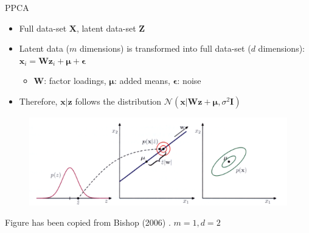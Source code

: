 \documentclass{beamer}
\begin{document}
\begin{frame}{PPCA}
\begin{itemize}
    \item Full data-set $\bm{X}$, latent data-set $\bm{Z}$
    \item Latent data ($m$ dimensions) is transformed into full data-set ($d$ dimensions): $\bm{x}_i = \bm{W}\bm{z}_i+\bm{\mu}+\bm{\epsilon}$
    \begin{itemize}
        \item $\bm{W}$: factor loadings, $\bm{\mu}$: added means, $\bm{\epsilon}$: noise
    \end{itemize}
    \item Therefore, $\bm{x}|\bm{z}$ follows the distribution $\mathcal{N}(\bm{x}|\bm{Wz}+\bm{\mu}, \sigma^2\bm{I})$
\end{itemize}

\begin{figure}
    \centering
    \includegraphics[width=.8\textwidth]{Screenshot_2020-07-14 Pattern Recognition and Machine Learning - Bishop_PatternRecognitionAndMachineLearning pdf.png}
\end{figure}
\footnotesize
Figure has been copied from Bishop (2006) \cite{bishop2006pattern}. $m=1, d=2$

\end{frame}
\end{document}

